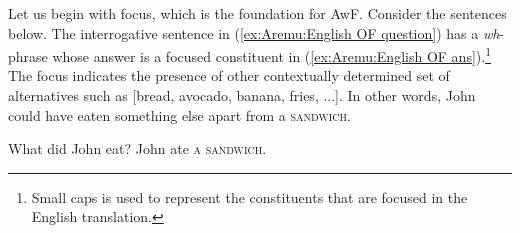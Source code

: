 \documentclass[output=paper,colorlinks,citecolor=brown,draftmode
]{langscibook}
\begin{document}

Let us begin with focus, which is the foundation for AwF. Consider the sentences below. The interrogative sentence in (\ref{ex:Aremu:English OF question}) has a \textit{wh}-phrase whose answer is a focused constituent in (\ref{ex:Aremu:English OF ans}).\footnote{Small caps is used to represent the constituents that are focused in the English translation.} The focus indicates the presence of other contextually determined set of alternatives such as [bread, avocado, banana, fries, ...]. In other words, John could have eaten something else apart from a \textsc{sandwich}. 

\ea \label{ex:Aremu:English focus} 

\begin{xlist}

\ex What did John eat? \label{ex:Aremu:English OF question}
\ex John ate \textsc{a sandwich}. \label{ex:Aremu:English OF ans}

\end{xlist} 
\z
\end{document}
